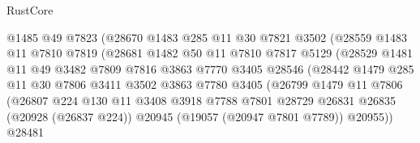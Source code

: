 \begin{lexlean}{RustCore}
\begin{coremodule}
                          @1485
                          @49
                          @7823
                          (@28670
                            @1483
                            @285
                            @11
                            @30
                            @7821
                            @3502
                            (@28559
                              @1483
                              @11
                              @7810
                              @7819
                              (@28681
                                @1482
                                @50
                                @11
                                @7810
                                @7817
                                @5129
                                (@28529
                                  @1481
                                  @11
                                  @49
                                  @3482
                                  @7809
                                  @7816
                                  @3863
                                  @7770
                                  @3405
                                  @28546
                                  (@28442
                                    @1479
                                    @285
                                    @11
                                    @30
                                    @7806
                                    @3411
                                    @3502
                                    @3863
                                    @7780
                                    @3405
                                    (@26799
                                      @1479
                                      @11
                                      @7806
                                      (@26807
                                        @224
                                        @130
                                        @11
                                        @3408
                                        @3918
                                        @7788
                                        @7801
                                        @28729
                                        @26831
                                        @26835
                                        (@20928 (@26837 @224))
                                        @20945
                                        (@19057 (@20947 @7801 @7789))
                                        @20955))
                                    @28481

\end{coremodule}
\end{lexlean}
